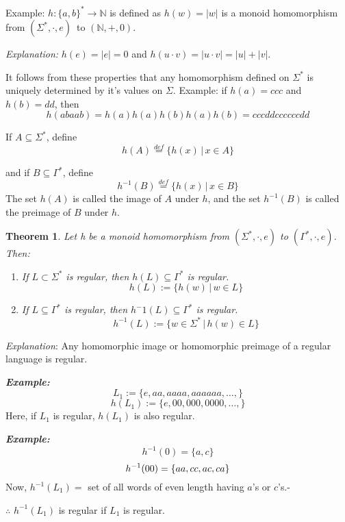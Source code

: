 \documentclass[12pt]{article}
\newtheorem{theorem}{Theorem}
\begin{document}
Example: $ h : \{a,b{\}}^* \rightarrow \mathbb{N} $ is defined as $ h(w) = |w| $ is a monoid homomorphism from $ (\Sigma^*, \cdot, e) $\ to $(\mathbb{N}, +, 0) $.

\emph{Explanation: } $ h(e) = |e| = 0 $ and $ h(u \cdot v) = |u \cdot v| = |u| + |v| $.


It follows from these properties that any homomorphism defined on $\Sigma^*$ is uniquely determined by it's values on $\Sigma$.
Example: if $h(a) = ccc $ and $ h(b) = dd $, then \[ h(abaab) = h(a)h(a)h(b)h(a)h(b) = cccddccccccdd \]

If $A\subseteq\Sigma^*$, define \[ h(A) \stackrel{def}{=} \{h(x) \,|\, x \in A\}\]

and if $ B\subseteq\Gamma^*$, define \[ h^{-1}(B) \stackrel{def}{=} \{h(x) \,|\, x \in B\} \]
The set $h(A)$ is called the image of $A$ under $h$, and the set $h^{-1}(B)$ is called the preimage of $B$ under $h$.


\begin{theorem}
   Let h be a monoid homomorphism from $ (\Sigma^*, \cdot, e) $ to $ (\Gamma^*, \cdot, e) $. Then:
   \begin{enumerate}
      \item If $ L \subset \Sigma^* $ is regular, then $ h(L) \subseteq \Gamma^* $ is regular. \[ h(L) := \{ h(w) \, | \, w \in L \}\]
      \item If $ L \subseteq \Gamma^* $ is regular, then $ h^-1(L) \subseteq \Gamma^* $ is regular. \[ h^{-1}(L) := \{ w \in \Sigma^* \, | \, h(w)\in L \}\]
   \end{enumerate}

\end{theorem}

\emph{Explanation}: Any homomorphic image or homomorphic preimage of a regular language is regular.


\emph{\textbf{Example:}} \[ L_1 := \{e,aa,aaaa,aaaaaa,\dots,\} \]
\[h(L_1) := \{e,00,000,0000,\dots,\}\]
Here, if $L_1$ is regular, $h(L_1)$ is also regular.

\emph{\textbf{Example:}} \[ h^{-1}(0) = \{a,c\} \] \[\space h^{-1}(00) = \{aa,cc,ac,ca\}\]
Now, $h^{-1}(L_1) =$ set of all words of even length having $a$'s or $ c$'s.-

$\therefore$ $h^{-1}(L_1)$ is regular if $L_1$ is regular.
\end{document}

